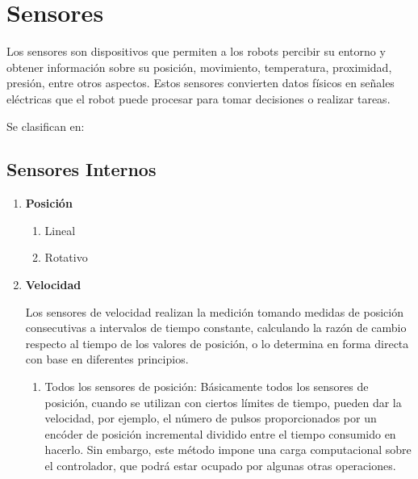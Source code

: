  \section{Sensores}
	Los sensores son dispositivos que permiten a los robots percibir su entorno y obtener información sobre su posición, movimiento, temperatura, proximidad, presión, entre otros aspectos. Estos sensores convierten datos físicos en señales eléctricas que el robot puede procesar para tomar decisiones o realizar tareas.

Se clasifican en:

	\subsection{Sensores Internos}
		\begin{enumerate}
			\item \textbf{Posición}
			\begin{enumerate}
				\item Lineal
				\item Rotativo
			\end{enumerate}
			
			\item \textbf{Velocidad}
			
            Los sensores de velocidad realizan la medición tomando medidas de posición consecutivas a intervalos de tiempo constante, calculando la razón de cambio respecto al tiempo de los valores de posición, o lo determina en forma directa con base en diferentes principios.\cite{saha2010robotics}\\
           
			
			\begin{enumerate}
				\item Todos los sensores de posición:
				Básicamente todos los sensores de posición, cuando se utilizan con ciertos límites de tiempo, pueden dar la velocidad, por ejemplo, el número de pulsos proporcionados por un encóder de posición incremental dividido entre el tiempo consumido en hacerlo. Sin embargo, este método impone una carga computacional sobre el controlador, que podrá estar ocupado por algunas otras operaciones.\\
		
		\begin{figure}[!ht]
			\centering
			\hfill
		\end{figure}
				

\end{enumerate}
\end{enumerate}
